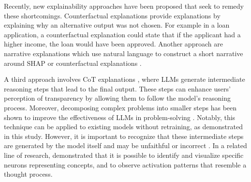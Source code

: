 Recently, new explainability approaches have been proposed that seek to remedy these shortcomings. Counterfactual explanations \parencite{Wachter2017} provide explanations by explaining why an alternative output was not chosen. For example in a loan application, a counterfactual explanation could state that if the applicant had a higher income, the loan would have been approved. Another approach are narrative explanations which use natural language to construct a short narrative around SHAP or counterfactual explanations \parencite{Martens2025}.

A third approach involves \ac{CoT} explanations \parencite{Wei2022}, where \acp{LLM} generate intermediate reasoning steps that lead to the final output. These steps can enhance users' perception of transparency by allowing them to follow the model's reasoning process. Moreover, decomposing complex problems into smaller steps has been shown to improve the effectiveness of \acp{LLM} in problem-solving \parencite{Wei2022}. Notably, this technique can be applied to existing models without retraining, as demonstrated in this study. However, it is important to recognize that these intermediate steps are generated by the model itself and may be unfaithful or incorrect \parencite{Turpin2023, Schneider2024}. In a related line of research, \textcite{Lindsey2025} demonstrated that it is possible to identify and visualize specific neurons representing concepts, and to observe activation patterns that resemble a thought process.







